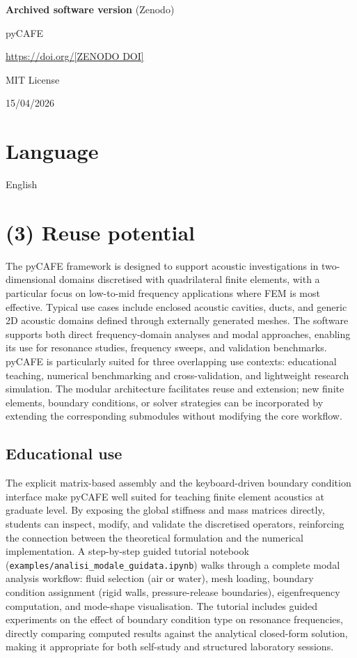 \documentclass{jors}
\begin{document}
{\bf Archived software version} (Zenodo)

\begin{description}[noitemsep,topsep=0pt]
	\item[Name:] pyCAFE
	\item[Persistent identifier:] \url{https://doi.org/[ZENODO DOI]}
	\item[Licence:] MIT License
	\item[Date published:] 15/04/2026
\end{description}

\section*{Language}
English

\section*{(3) Reuse potential}
The pyCAFE framework is designed to support acoustic investigations in two-dimensional domains discretised with quadrilateral finite elements, with a particular focus on low-to-mid frequency applications where FEM is most effective. Typical use cases include enclosed acoustic cavities, ducts, and generic 2D acoustic domains defined through externally generated meshes. The software supports both direct frequency-domain analyses and modal approaches, enabling its use for resonance studies, frequency sweeps, and validation benchmarks. pyCAFE is particularly suited for three overlapping use contexts: educational teaching, numerical benchmarking and cross-validation, and lightweight research simulation. The modular architecture facilitates reuse and extension; new finite elements, boundary conditions, or solver strategies can be incorporated by extending the corresponding submodules without modifying the core workflow.

\subsection*{Educational use}

The explicit matrix-based assembly and the keyboard-driven boundary condition interface make pyCAFE well suited for teaching finite element acoustics at graduate level. By exposing the global stiffness and mass matrices directly, students can inspect, modify, and validate the discretised operators, reinforcing the connection between the theoretical formulation and the numerical implementation. A step-by-step guided tutorial notebook (\texttt{examples/analisi\_modale\_guidata.ipynb}) walks through a complete modal analysis workflow: fluid selection (air or water), mesh loading, boundary condition assignment (rigid walls, pressure-release boundaries), eigenfrequency computation, and mode-shape visualisation. The tutorial includes guided experiments on the effect of boundary condition type on resonance frequencies, directly comparing computed results against the analytical closed-form solution, making it appropriate for both self-study and structured laboratory sessions.
\end{document}
